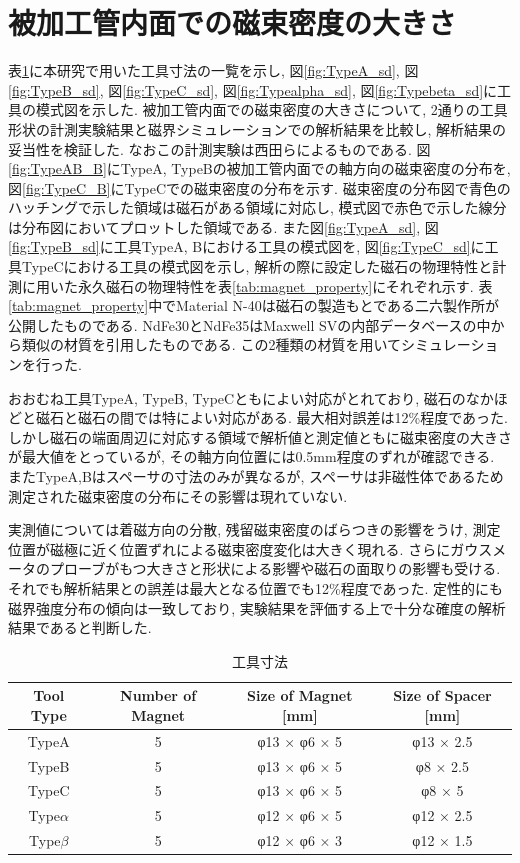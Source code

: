 \documentclass[11pt]{jarticle}
\begin{document}
\section{被加工管内面での磁束密度の大きさ}
表\ref{tab:tool_size}に本研究で用いた工具寸法の一覧を示し, 図\ref{fig:TypeA_sd}, 図\ref{fig:TypeB_sd}, 図\ref{fig:TypeC_sd}, 図\ref{fig:Typealpha_sd}, 図\ref{fig:Typebeta_sd}に工具の模式図を示した. 
被加工管内面での磁束密度の大きさについて, 2通りの工具形状の計測実験結果と磁界シミュレーションでの解析結果を比較し, 解析結果の妥当性を検証した. なおこの計測実験は西田ら\cite{西田}によるものである. 図\ref{fig:TypeAB_B}にTypeA, TypeBの被加工管内面での軸方向の磁束密度の分布を, 図\ref{fig:TypeC_B}にTypeCでの磁束密度の分布を示す. 磁束密度の分布図で青色のハッチングで示した領域は磁石がある領域に対応し, 模式図で赤色で示した線分は分布図においてプロットした領域である. また図\ref{fig:TypeA_sd}, 図\ref{fig:TypeB_sd}に工具TypeA, Bにおける工具の模式図を, 図\ref{fig:TypeC_sd}に工具TypeCにおける工具の模式図を示し, 解析の際に設定した磁石の物理特性と計測に用いた永久磁石の物理特性を表\ref{tab:magnet_property}にそれぞれ示す. 表\ref{tab:magnet_property}中でMaterial N-40は磁石の製造もとである二六製作所が公開したものである. NdFe30とNdFe35はMaxwell SVの内部データベースの中から類似の材質を引用したものである. この2種類の材質を用いてシミュレーションを行った. \par
おおむね工具TypeA, TypeB, TypeCともによい対応がとれており, 磁石のなかほどと磁石と磁石の間では特によい対応がある. 最大相対誤差は12\%程度であった. しかし磁石の端面周辺に対応する領域で解析値と測定値ともに磁束密度の大きさが最大値をとっているが, その軸方向位置には0.5mm程度のずれが確認できる. またTypeA,Bはスペーサの寸法のみが異なるが, スペーサは非磁性体であるため測定された磁束密度の分布にその影響は現れていない. \par
実測値については着磁方向の分散, 残留磁束密度のばらつきの影響をうけ, 測定位置が磁極に近く位置ずれによる磁束密度変化は大きく現れる. さらにガウスメータのプローブがもつ大きさと形状による影響や磁石の面取りの影響も受ける. それでも解析結果との誤差は最大となる位置でも12\%程度であった. 定性的にも磁界強度分布の傾向は一致しており, 実験結果を評価する上で十分な確度の解析結果であると判断した. 

  \begin{table}[H]
    \begin{tabular}{|c||c|c|c|} \hline
        Tool Type & Number of Magnet & Size of Magnet [mm] & Size of Spacer [mm] \\ \hline \hline
        TypeA & 5 & φ13 × φ6 × 5 & φ13 × 2.5  \\ \hline
        TypeB & 5 & φ13 × φ6 × 5 & φ8 × 2.5   \\ \hline
        TypeC & 5 & φ13 × φ6 × 5 & φ8 × 5   \\ \hline
        Type$\alpha$ & 5 & φ12 × φ6 × 5 & φ12 × 2.5   \\ \hline
        Type$\beta$ & 5 & φ12 × φ6 × 3 & φ12 × 1.5   \\ \hline
    \end{tabular}
    \centering
    \caption{工具寸法}
    \label{tab:tool_size}
  \end{table}
\end{document}
